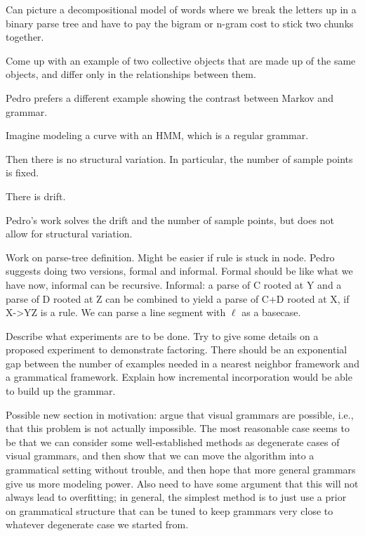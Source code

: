 \documentclass{article}
\begin{document}
\item Can picture a decompositional model of words where we break the
  letters up in a binary parse tree and have to pay the bigram or
  n-gram cost to stick two chunks together.

\item Come up with an example of two collective objects that are made
  up of the same objects, and differ only in the relationships between
  them.

\item Pedro prefers a different example showing the contrast between
  Markov and grammar.

  Imagine modeling a curve with an HMM, which is a regular grammar.

  Then there is no structural variation. In particular, the number of
  sample points is fixed.

  There is drift.

  Pedro's work solves the drift and the number of sample points, but
  does not allow for structural variation.

\item Work on parse-tree definition. Might be easier if rule is stuck
  in node. Pedro suggests doing two versions, formal and
  informal. Formal should be like what we have now, informal can be
  recursive. Informal: a parse of C rooted at Y and a parse of D
  rooted at Z can be combined to yield a parse of C+D rooted at X, if
  X->YZ is a rule. We can parse a line segment with $\ell$ as a
  basecase.

\item Describe what experiments are to be done. Try to give some
  details on a proposed experiment to demonstrate factoring. There
  should be an exponential gap between the number of examples needed
  in a nearest neighbor framework and a grammatical framework. Explain
  how incremental incorporation would be able to build up the grammar.

\item Possible new section in motivation: argue that visual grammars
  are possible, i.e., that this problem is not actually
  impossible. The most reasonable case seems to be that we can
  consider some well-established methods as degenerate cases of visual
  grammars, and then show that we can move the algorithm into a
  grammatical setting without trouble, and then hope that more general
  grammars give us more modeling power. Also need to have some
  argument that this will not always lead to overfitting; in general,
  the simplest method is to just use a prior on grammatical structure
  that can be tuned to keep grammars very close to whatever degenerate
  case we started from.
\end{document}
